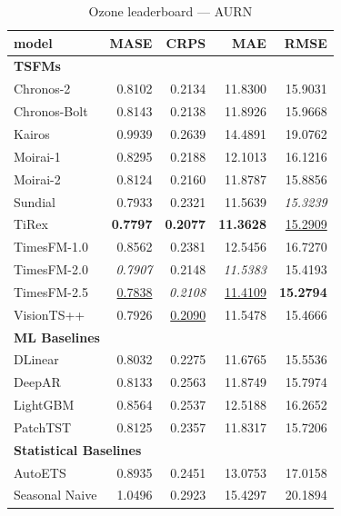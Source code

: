 \begin{table}[H]
\caption{Ozone leaderboard --- AURN}
\centering
\begin{small}
\begin{tabular}{lrrrr}
\toprule
model & MASE & CRPS & MAE & RMSE \\
\midrule
\multicolumn{5}{l}{\textbf{TSFMs}} \\
Chronos-2 & 0.8102 & 0.2134 & 11.8300 & 15.9031 \\
Chronos-Bolt & 0.8143 & 0.2138 & 11.8926 & 15.9668 \\
Kairos & 0.9939 & 0.2639 & 14.4891 & 19.0762 \\
Moirai-1 & 0.8295 & 0.2188 & 12.1013 & 16.1216 \\
Moirai-2 & 0.8124 & 0.2160 & 11.8787 & 15.8856 \\
Sundial & 0.7933 & 0.2321 & 11.5639 & \textit{15.3239} \\
TiRex & \textbf{0.7797} & \textbf{0.2077} & \textbf{11.3628} & \underline{15.2909} \\
TimesFM-1.0 & 0.8562 & 0.2381 & 12.5456 & 16.7270 \\
TimesFM-2.0 & \textit{0.7907} & 0.2148 & \textit{11.5383} & 15.4193 \\
TimesFM-2.5 & \underline{0.7838} & \textit{0.2108} & \underline{11.4109} & \textbf{15.2794} \\
VisionTS++ & 0.7926 & \underline{0.2090} & 11.5478 & 15.4666 \\
\midrule
\multicolumn{5}{l}{\textbf{ML Baselines}} \\
DLinear & 0.8032 & 0.2275 & 11.6765 & 15.5536 \\
DeepAR & 0.8133 & 0.2563 & 11.8749 & 15.7974 \\
LightGBM & 0.8564 & 0.2537 & 12.5188 & 16.2652 \\
PatchTST & 0.8125 & 0.2357 & 11.8317 & 15.7206 \\
\midrule
\multicolumn{5}{l}{\textbf{Statistical Baselines}} \\
AutoETS & 0.8935 & 0.2451 & 13.0753 & 17.0158 \\
Seasonal Naive & 1.0496 & 0.2923 & 15.4297 & 20.1894 \\
\bottomrule
\end{tabular}
\end{small}
\end{table}